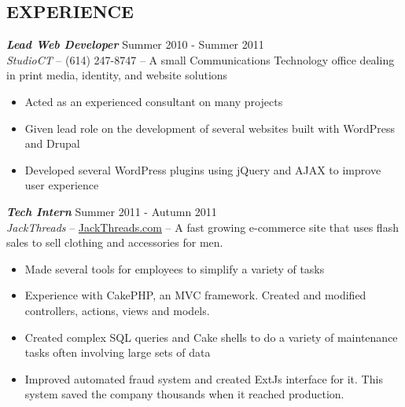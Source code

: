 \documentclass[line,letterpaper]{resume}
\begin{document}
\begin{resume}
    \vspace{-16pt}

    \section{\uppercase{Experience}} {\sl\textbf{Lead Web Developer}} \hfill
    Summer 2010 - Summer 2011\\
    \emph{StudioCT} -- (614) 247-8747 -- A small Communications Technology
    office dealing in print media, identity, and website solutions 
    \begin{itemize}  
        \item Acted as an experienced consultant on many projects
        \item Given lead role on the development of several websites built with
            WordPress and Drupal
        \item Developed several WordPress plugins using jQuery and AJAX to
            improve user experience
    \end{itemize}

    {\sl\textbf{Tech Intern}} \hfill Summer 2011 - Autumn 2011 \\
    \emph{JackThreads} -- \href{http://www.jackthreads.com/}{JackThreads.com}
    -- A fast growing e-commerce site that uses flash sales to sell clothing and
    accessories for men.
    \begin{itemize}  
        \item Made several tools for employees to simplify a variety of tasks
        \item Experience with CakePHP, an MVC framework. Created and modified
            controllers, actions, views and models.
        \item Created complex SQL queries and Cake shells to do a variety of
            maintenance tasks often involving large sets of data
        \item Improved automated fraud system and created ExtJs interface for
            it. This system saved the company thousands when it reached
            production.
    \end{itemize} 


\end{resume}
\end{document}
